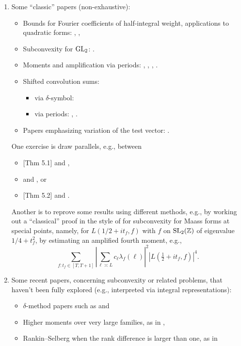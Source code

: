 \documentclass[reqno]{amsart} 
\begin{document}
\begin{enumerate}
\item Some ``classic'' papers (non-exhaustive):
  \begin{itemize}
  \item Bounds for Fourier coefficients of half-integral weight, applications to quadratic forms: \cite{MR870736}, \cite{MR931205}, \cite{MR1437494}
  \item Subconvexity for $\operatorname{GL}_2$: \cite{DFI93} \cite{DFI94} \cite{DFI01}.
  \item Moments and amplification via periods:  \cite{venkatesh-2005}, \cite{michel-2009}, \cite{iwan-sar}, \cite{MR780071}.
  \item Shifted convolution sums:
    \begin{itemize}
    \item via $\delta$-symbol: \cite{DFI93}
    \item via periods: \cite{Sar01}\cite{MR2437682}, \cite{2024arXiv2404.10692}.
    \end{itemize}
  \item Papers emphasizing variation of the test vector:   \cite{MR2373356, MR2726097, venkatesh-2005}.
  \end{itemize}
  One exercise is draw parallels, e.g., between
  \begin{itemize}
  \item \cite{michel-2009}[Thm 5.1] and \cite{DFI93},
  \item \cite[\S4]{venkatesh-2005} and \cite{DFI94}, or
  \item \cite{michel-2009}[Thm 5.2] and \cite{DFI01}.
  \end{itemize}
  Another is to reprove some results using different methods, e.g., by working out a ``classical'' proof in the style of \cite{DFI01} for subconvexity for Maass forms at special points, namely, for $L(1/2 + i t_f, f)$ with $f$ on $\operatorname{SL}_2(\mathbb{Z})$ of eigenvalue $1/4 + t_f^2$, by estimating an amplified fourth moment, e.g.,
  \begin{equation*}
    \sum_{f : t_f \in [T, T+1]}
    \left| \sum_{\ell \asymp L}
      c_{\ell}   \lambda_f(\ell)\right|^2
    \left| L(\tfrac{1}{2} + i t_f, f) \right|^4.    
  \end{equation*}

\item Some recent papers, concerning subconvexity or related problems, that haven't been fully explored (e.g., interpreted via integral representations):
  \begin{itemize}
  \item $\delta$-method papers such as \cite{MR4416133} and \cite{2022arXiv2206.06517}
  \item Higher moments over very large families, as in \cite{MR4216694}, \cite{MR4067357}
  \item Rankin--Selberg when the rank difference is larger than one, as in \cite{MR3996341}
  \end{itemize}


\end{enumerate}
\end{document}
